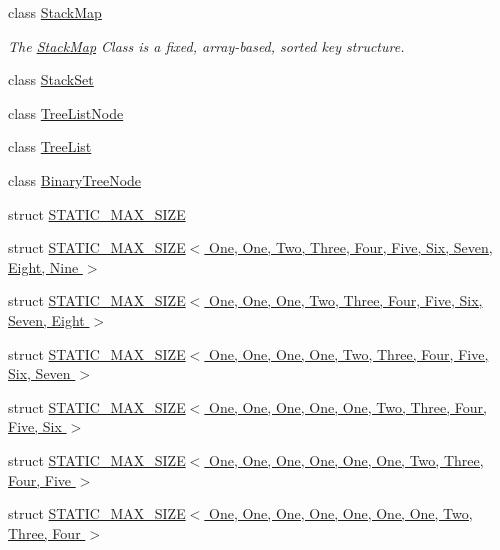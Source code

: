 \begin{CompactItemize}
class \hyperlink{class_j_g_t_l_1_1_stack_map}{Stack\-Map}
\begin{CompactList}\small\item\em The \hyperlink{class_j_g_t_l_1_1_stack_map}{Stack\-Map} Class is a fixed, array-based, sorted key structure. \item\end{CompactList}\item 
class \hyperlink{class_j_g_t_l_1_1_stack_set}{Stack\-Set}
\item 
class \hyperlink{class_j_g_t_l_1_1_tree_list_node}{Tree\-List\-Node}
\item 
class \hyperlink{class_j_g_t_l_1_1_tree_list}{Tree\-List}
\item 
class \hyperlink{class_j_g_t_l_1_1_binary_tree_node}{Binary\-Tree\-Node}
\item 
struct \hyperlink{struct_j_g_t_l_1_1_s_t_a_t_i_c___m_a_x___s_i_z_e}{STATIC\_\-MAX\_\-SIZE}
\item 
struct \hyperlink{struct_j_g_t_l_1_1_s_t_a_t_i_c___m_a_x___s_i_z_e_3_01_one_00_01_one_00_01_two_00_01_three_00_01_f759e6bc76a9114cc8ef25088b44cc11}{STATIC\_\-MAX\_\-SIZE$<$ One, One, Two, Three, Four, Five, Six, Seven, Eight, Nine $>$}
\item 
struct \hyperlink{struct_j_g_t_l_1_1_s_t_a_t_i_c___m_a_x___s_i_z_e_3_01_one_00_01_one_00_01_one_00_01_two_00_01_the35ecf7c7360ce295a7d197f78c1831e}{STATIC\_\-MAX\_\-SIZE$<$ One, One, One, Two, Three, Four, Five, Six, Seven, Eight $>$}
\item 
struct \hyperlink{struct_j_g_t_l_1_1_s_t_a_t_i_c___m_a_x___s_i_z_e_3_01_one_00_01_one_00_01_one_00_01_one_00_01_tw5a2eea924c533f564bf1050b20ef91fc}{STATIC\_\-MAX\_\-SIZE$<$ One, One, One, One, Two, Three, Four, Five, Six, Seven $>$}
\item 
struct \hyperlink{struct_j_g_t_l_1_1_s_t_a_t_i_c___m_a_x___s_i_z_e_3_01_one_00_01_one_00_01_one_00_01_one_00_01_on9f6e865142ccd9af848bb97d1dbfdb72}{STATIC\_\-MAX\_\-SIZE$<$ One, One, One, One, One, Two, Three, Four, Five, Six $>$}
\item 
struct \hyperlink{struct_j_g_t_l_1_1_s_t_a_t_i_c___m_a_x___s_i_z_e_3_01_one_00_01_one_00_01_one_00_01_one_00_01_on2fb88e04d0121b9aa29a50f9670e334c}{STATIC\_\-MAX\_\-SIZE$<$ One, One, One, One, One, One, Two, Three, Four, Five $>$}
\item 
struct \hyperlink{struct_j_g_t_l_1_1_s_t_a_t_i_c___m_a_x___s_i_z_e_3_01_one_00_01_one_00_01_one_00_01_one_00_01_on1ea2882b2f3315e024773e1becf2883f}{STATIC\_\-MAX\_\-SIZE$<$ One, One, One, One, One, One, One, Two, Three, Four $>$}

\end{CompactItemize}
